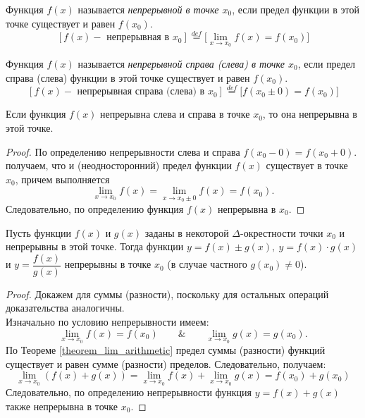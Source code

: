 

\begin{definition}
Функция \(f(x)\) называется \textit{непрерывной в точке \(x_{0}\)}, если предел функции
в этой точке существует и равен \(f(x_{0})\).
\[
[ f(x) - \text{ непрерывная в } x_{0} ] \overset{def}{=}
\Big[ \lim_{ x \to x_{0} } f(x) = f(x_{0}) \Big]
\]
\end{definition}

\begin{definition}
Функция \(f(x)\) называется \textit{непрерывной справа (слева) в точке \(x_{0}\)},
если предел справа (слева) функции в этой точке существует и равен \(f(x_{0})\).
\[
[ f(x) - \text{ непрерывная справа (слева) в } x_{0} ] \overset{def}{=}
\Big[ f(x_{0} \pm 0) = f(x_{0}) \Big]
\]
\end{definition}

\begin{statement}
Если функция \(f(x)\) непрерывна слева и справа в точке \(x_{0}\),
то она непрерывна в этой точке.

\begin{proof}
По определению непрерывности слева и справа \(f(x_{0} - 0) = f(x_{0} + 0)\).
 получаем, что и (неодносторонний) предел
функции \(f(x)\) существует в точке \(x_{0}\), причем выполняется
\[
\lim_{ x \to x_{0} } f(x) = \lim_{ x \to x_{0} \pm 0} f(x) = f(x_{0}).
\]
Следовательно, по определению функция \(f(x)\) непрерывна в \(x_{0}\).
\end{proof}
\end{statement}

\begin{theorem}
Пусть функции \(f(x)\) и \(g(x)\) заданы в некоторой \(\Delta\)-окрестности точки \(x_{0}\)
и непрерывны в этой точке. Тогда функции \(y = f(x) \pm g(x), ~ y = f(x) \cdot g(x)\)
и \(y = \dfrac{f(x)}{g(x)}\) непрерывны в точке \(x_{0}\) (в случае частного \(g(x_{0}) \neq 0\)).

\begin{proof}
Докажем для суммы (разности),
поскольку для остальных операций доказательства аналогичны. \\
Изначально по условию непрерывности имеем:
\[
\lim_{ x \to x_{0} } f(x) = f(x_{0}) \qquad \& \qquad \lim_{ x \to x_{0} } g(x) = g(x_{0}).
\]
По Теореме \ref{theorem_lim_arithmetic} предел суммы (разности) функций существует
и равен сумме (разности) пределов. Следовательно, получаем:
\[
\lim_{ x \to x_{0} } (f(x) + g(x)) = \lim_{ x \to x_{0} } f(x) + \lim_{ x \to x_{0} } g(x) =
f(x_{0}) + g(x_{0})
\]
Следовательно, по определению непрерывности функция \(y = f(x) + g(x)\)
также непрерывна в точке \(x_{0}\).
\end{proof}
\end{theorem}

